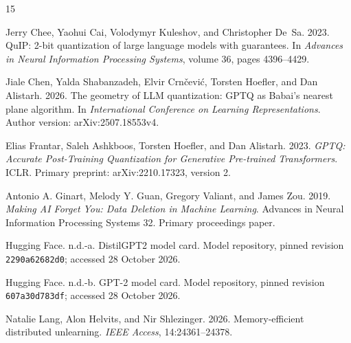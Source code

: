 \documentclass[11pt,a4paper]{article}
\def\href#1#2{{#2}}
\begin{document}
\begin{thebibliography}{15}

Jerry Chee, Yaohui Cai, Volodymyr Kuleshov, and Christopher De~Sa. 2023.
\href{https://proceedings.neurips.cc/paper_files/paper/2023/hash/0df38cd13520747e1e64e5b123a78ef8-Abstract-Conference.html}{QuIP: 2-bit quantization of large language models with guarantees}.
In \emph{Advances in Neural Information Processing Systems}, volume 36, pages 4396--4429.

Jiale Chen, Yalda Shabanzadeh, Elvir Crn\v{c}evi\'{c}, Torsten Hoefler, and Dan Alistarh. 2026.
\href{https://arxiv.org/abs/2507.18553v4}{The geometry of LLM quantization: GPTQ as Babai's nearest plane algorithm}.
In \emph{International Conference on Learning Representations}. Author version: arXiv:2507.18553v4.

Elias Frantar, Saleh Ashkboos, Torsten Hoefler, and Dan Alistarh.
2023. \emph{GPTQ: Accurate Post-Training Quantization for Generative Pre-trained
Transformers}. ICLR. Primary preprint:
\href{https://arxiv.org/abs/2210.17323v2}{arXiv:2210.17323, version 2}.

Antonio A. Ginart, Melody Y. Guan, Gregory Valiant, and James Zou.
2019. \emph{Making AI Forget You: Data Deletion in Machine Learning}.
Advances in Neural Information Processing Systems 32.
\href{https://papers.nips.cc/paper_files/paper/2019/file/cb79f8fa58b91d3af6c9c991f63962d3-Paper.pdf}{Primary proceedings paper}.

Hugging Face. n.d.-a.
\href{https://huggingface.co/distilbert/distilgpt2/blob/2290a62682d06624634c1f46a6ad5be0f47f38aa/README.md}{DistilGPT2 model card}.
Model repository, pinned revision \nolinkurl{2290a62682d0}; accessed 28 October 2026.

Hugging Face. n.d.-b.
\href{https://huggingface.co/openai-community/gpt2/blob/607a30d783dfa663caf39e06633721c8d4cfcd7e/README.md}{GPT-2 model card}.
Model repository, pinned revision \nolinkurl{607a30d783df}; accessed 28 October 2026.

Natalie Lang, Alon Helvits, and Nir Shlezinger. 2026.
\href{https://doi.org/10.1109/ACCESS.2026.3663428}{Memory-efficient distributed unlearning}.
\emph{IEEE Access}, 14:24361--24378.


\end{thebibliography}
\end{document}
